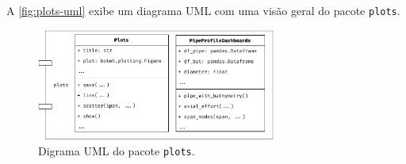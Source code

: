 A \autoref{fig:plots-uml} exibe um diagrama UML com uma visão geral do pacote \texttt{plots}.

\begin{figure}[!ht]
    \centering
    \caption{Digrama UML do pacote \texttt{plots}.}\label{fig:plots-uml}
    \includegraphics[width=0.7\textwidth]{imagens/plots-uml}
\end{figure}